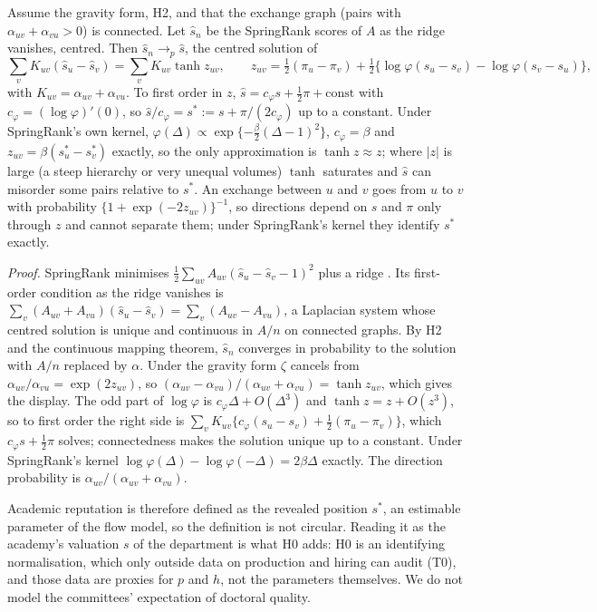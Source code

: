 \begin{thyaprop}\label{prop:thy-springrank}
Assume the gravity form, H2, and that the exchange graph (pairs with $\alpha_{uv}+\alpha_{vu}>0$) is connected. Let
$\hat s_n$ be the SpringRank scores of $A$ as the ridge vanishes, centred. Then $\hat s_n\to_p\hat s$, the centred
solution of
\[
\sum_vK_{uv}(\hat s_u-\hat s_v)=\sum_vK_{uv}\tanh z_{uv},\qquad
z_{uv}=\tfrac12(\pi_u-\pi_v)+\tfrac12\{\log\varphi(s_u-s_v)-\log\varphi(s_v-s_u)\},
\]
with $K_{uv}=\alpha_{uv}+\alpha_{vu}$. To first order in $z$, $\hat s=c_\varphi s+\tfrac12\pi+\text{const}$ with
$c_\varphi=(\log\varphi)'(0)$, so $\hat s/c_\varphi=s^*:=s+\pi/(2c_\varphi)$ up to a constant. Under SpringRank's own
kernel, $\varphi(\Delta)\propto\exp\{-\tfrac{\beta}{2}(\Delta-1)^2\}$, $c_\varphi=\beta$ and
$z_{uv}=\beta(s^*_u-s^*_v)$ exactly, so the only approximation is $\tanh z\approx z$; where $|z|$ is large (a steep
hierarchy or very unequal volumes) $\tanh$ saturates and $\hat s$ can misorder some pairs relative to $s^*$. An
exchange between $u$ and $v$ goes from $u$ to $v$ with probability $\{1+\exp(-2z_{uv})\}^{-1}$, so directions
depend on $s$ and $\pi$ only through $z$ and cannot separate them; under SpringRank's kernel they identify $s^*$
exactly.
\end{thyaprop}

\emph{Proof.} SpringRank minimises $\tfrac12\sum_{uv}A_{uv}(\hat s_u-\hat s_v-1)^2$ plus a ridge
\citep{debacco2018physical}. Its first-order condition as the ridge vanishes is
$\sum_v(A_{uv}+A_{vu})(\hat s_u-\hat s_v)=\sum_v(A_{uv}-A_{vu})$, a Laplacian system whose centred solution is
unique and continuous in $A/n$ on connected graphs. By H2 and the continuous mapping theorem, $\hat s_n$ converges in
probability to the solution with $A/n$ replaced by $\alpha$. Under the gravity form $\zeta$ cancels from
$\alpha_{uv}/\alpha_{vu}=\exp(2z_{uv})$, so $(\alpha_{uv}-\alpha_{vu})/(\alpha_{uv}+\alpha_{vu})=\tanh z_{uv}$, which
gives the display. The odd part of $\log\varphi$ is $c_\varphi\Delta+O(\Delta^3)$ and $\tanh z=z+O(z^3)$, so to first
order the right side is $\sum_vK_{uv}\{c_\varphi(s_u-s_v)+\tfrac12(\pi_u-\pi_v)\}$, which $c_\varphi s+\tfrac12\pi$
solves; connectedness makes the solution unique up to a constant. Under SpringRank's kernel
$\log\varphi(\Delta)-\log\varphi(-\Delta)=2\beta\Delta$ exactly. The direction probability is
$\alpha_{uv}/(\alpha_{uv}+\alpha_{vu})$. \thyqed

Academic reputation is therefore defined as the revealed position $s^*$, an estimable parameter of the flow model,
so the definition is not circular. Reading it as the academy's valuation $s$ of the department is what H0 adds: H0
is an identifying normalisation, which only outside data on production and hiring can audit (T0), and those data
are proxies for $p$ and $h$, not the parameters themselves. We do not model the committees' expectation of doctoral
quality.

